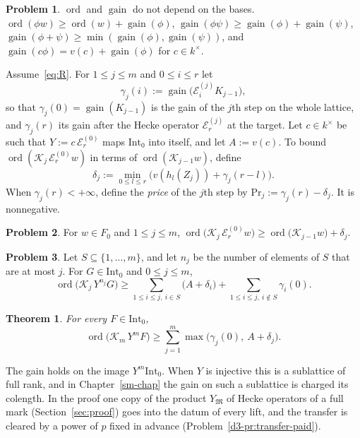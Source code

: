 \documentclass[reqno]{amsart}
\newcounter{chap}
\theoremstyle{definition}
\newtheorem{problem}{Problem}[section]
\theoremstyle{plain}
\newtheorem{theorem}{Theorem}[section]
\theoremstyle{remark}
\newcommand{\Ec}{\mathcal{E}}
\newcommand{\Kc}{\mathcal{K}}
\newcommand{\Int}{\mathrm{Int}}
\newcommand{\Price}{\mathrm{Pr}}
\newcommand{\gain}{\operatorname{gain}}
\newcommand{\ord}{\operatorname{ord}}
\begin{document}
\begin{problem}\label{pr:gain}
\(\ord\) and \(\gain\) do not depend on the bases.  \(\ord(\phi w) \ge \ord(w) + \gain(\phi)\), \(\gain(\phi\psi) \ge \gain(\phi) + \gain(\psi)\), \(\gain(\phi + \psi) \ge \min(\gain(\phi), \gain(\psi))\), and \(\gain(c\phi) = v(c) + \gain(\phi)\) for \(c \in k^\times\).
\end{problem}

Assume~\eqref{eq:R}.  For \(1 \le j \le m\) and \(0 \le i \le r\) let
\[
  \gamma_j(i) := \gain\bigl(\Ec^{(j)}_i K_{j-1}\bigr) ,
\]
so that \(\gamma_j(0) = \gain(K_{j-1})\) is the gain of the \(j\)th step on the whole lattice, and \(\gamma_j(r)\) its gain after the Hecke operator \(\Ec^{(j)}_r\) at the target.  Let \(c \in k^\times\) be such that \(Y := c\, \Ec^{(0)}_r\) maps \(\Int_0\) into itself, and let \(A := v(c)\).  To bound \(\ord(\Kc_j\, \Ec^{(0)}_r w)\) in terms of \(\ord(\Kc_{j-1} w)\), define
\[
  \delta_j := \min_{0 \le l \le r} \bigl( v(h_l(Z_j)) + \gamma_j(r - l) \bigr) .
\]
When \(\gamma_j(r) < +\infty\), define the \emph{price} of the \(j\)th step by \(\Price_j := \gamma_j(r) - \delta_j\).  It is nonnegative.

\begin{problem}\label{pr:one-step}
For \(w \in F_0\) and \(1 \le j \le m\), \(\ord\bigl(\Kc_j\, \Ec^{(0)}_r w\bigr) \ge \ord\bigl(\Kc_{j-1} w\bigr) + \delta_j\).
\end{problem}

\begin{problem}\label{pr:induction}
Let \(S \subseteq \{1, \dots, m\}\), and let \(n_j\) be the number of elements of \(S\) that are at most \(j\).  For \(G \in \Int_0\) and \(0 \le j \le m\),
\[
  \ord\bigl(\Kc_j\, Y^{n_j} G\bigr) \ge \sum_{1 \le i \le j,\ i \in S} \bigl(A + \delta_i\bigr) + \sum_{1 \le i \le j,\ i \notin S} \gamma_i(0) .
\]
\end{problem}

\begin{theorem}\label{thm:chain-gain}
For every \(F \in \Int_0\),
\[
  \ord\bigl(\Kc_m\, Y^m F\bigr) \ge \sum_{j=1}^m \max\bigl(\gamma_j(0),\ A + \delta_j\bigr) .
\]
\end{theorem}

The gain holds on the image \(Y^m \Int_0\).  When \(Y\) is injective this is a sublattice of full rank, and in Chapter~\ref{sm-chap} the gain on such a sublattice is charged its colength.  In the proof one copy of the product \(Y_{\mathfrak{M}}\) of Hecke operators of a full mark (Section~\ref{sec:proof}) goes into the datum of every lift, and the transfer is cleared by a power of \(p\) fixed in advance (Problem~\ref{d3-pr:transfer-paid}).
\end{document}
